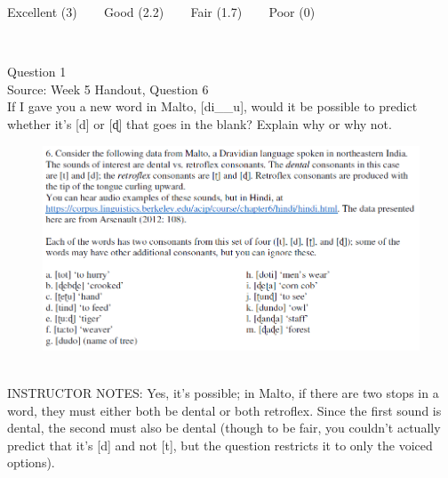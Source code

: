 \documentclass[12pt]{article}
\begin{document}
\vfill
Excellent (3) ~~~ Good (2.2) ~~~ Fair (1.7) ~~~ Poor (0)
\newpage

\begin{center}
\textbf{{\color{red}{\HUGE END OF EXAM}}}\\

\end{center}
\newpage

\begin{center}
\textbf{{\color{blue}{\HUGE START OF EXAM\\}}}

\textbf{{\color{blue}{\HUGE Student ID: 60467\\}}}

\textbf{{\color{blue}{\HUGE 4:30\\}}}

\end{center}
\newpage

{\large Question 1}\\

Source: Week 5 Handout, Question 6\\

If I gave you a new word in Malto, [di\_\_u], would it be possible to predict whether it's [d] or [ɖ] that goes in the blank? Explain why or why not.\\

\begin{figure}[H]
\includegraphics{../images/malto.png}
\end{figure}

~\\
INSTRUCTOR NOTES: Yes, it's possible; in Malto, if there are two stops in a word, they must either both be dental or both retroflex. Since the first sound is dental, the second must also be dental (though to be fair, you couldn't actually predict that it's [d] and not [t], but the question restricts it to only the voiced options).
\end{document}

